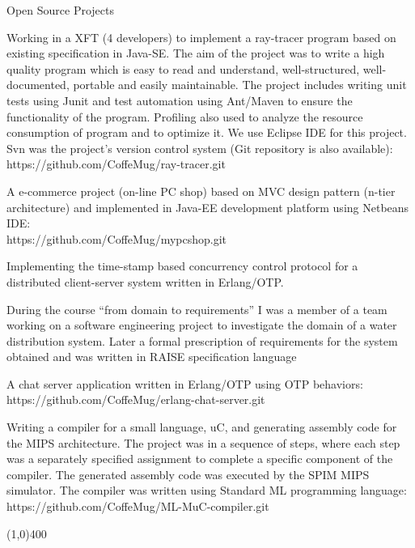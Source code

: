 \documentclass{resume}
\begin{document}
\begin{category}{Open Source Projects}

\citembullet
Working in a XFT (4 developers) to implement a ray-tracer program based on 
existing specification in Java-SE.
The aim of the project was to write a high quality program which is easy 
to read and understand, well-structured, well-documented, portable and easily maintainable.   
The project includes writing unit tests using Junit and test automation 
using Ant/Maven to ensure the functionality of the program.
Profiling also used to analyze the resource consumption of program and to optimize it. 
We use Eclipse IDE for this project.
Svn was the project's version control system (Git repository is also available):\\
https://github.com/CoffeMug/ray-tracer.git

\citembullet A e-commerce project (on-line PC shop) based on MVC design 
pattern (n-tier architecture) and implemented in Java-EE development platform 
using Netbeans IDE:\\
https://github.com/CoffeMug/mypcshop.git

\citembullet
Implementing the time-stamp based concurrency control protocol for a 
distributed client-server system written in Erlang/OTP.

\citembullet
During the course ``from domain to requirements'' I was a member of a team 
working on a software engineering project to investigate the domain of a 
water distribution system. 
Later a formal prescription of requirements for the system obtained 
and was written in RAISE specification language

\citembullet
A chat server application written in Erlang/OTP using OTP behaviors:\\
https://github.com/CoffeMug/erlang-chat-server.git


\citembullet Writing a compiler for a small language, uC, and generating assembly 
code for the MIPS architecture.
The project was in a sequence of steps, where each step was a separately specified 
assignment to complete a specific component of the compiler.
The generated assembly code was executed by the SPIM MIPS simulator. 
The compiler was written using Standard ML programming language:
https://github.com/CoffeMug/ML-MuC-compiler.git

\end{category}

\begin{center}
\line(1,0){400}
\end{center}
\end{document}
